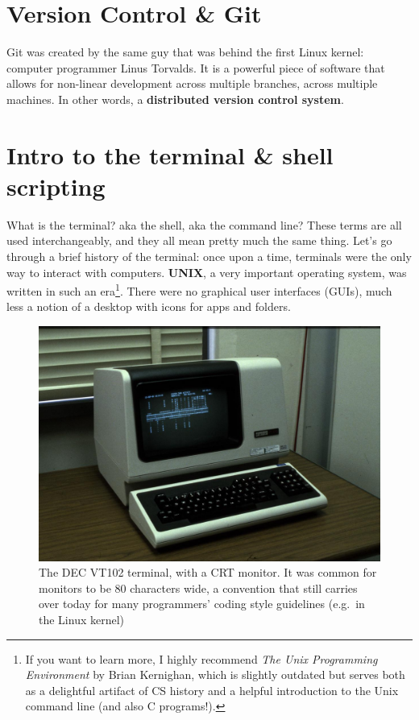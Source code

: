 \documentclass[fontsize=12pt,twoside=on,openright,parskip=half]{scrbook}
\begin{document}
\section*{Version Control \& Git}

Git was created by the same guy that was behind the first Linux kernel:
computer programmer Linus Torvalds. It is a powerful piece of software that
allows for non-linear development across multiple branches, across multiple
machines. In other words, a \textbf{distributed version control system}. 

\blindtext

\section*{Intro to the terminal \& shell scripting}

What is the terminal? aka the shell, aka the command line? These terms are all
used interchangeably, and they all mean pretty much the same thing. Let’s go
through a brief history of the terminal: once upon a time, terminals were the
only way to interact with computers. \textbf{UNIX}, a very important operating
system, was written in such an era\footnote{If you want to learn more, I highly
recommend \textit{The Unix Programming Environment} by Brian Kernighan, which
is slightly outdated but serves both as a delightful artifact of CS history and
a helpful introduction to the Unix command line (and also C programs!).}. There
were no graphical user interfaces (GUIs), much less a notion of a desktop with
icons for apps and folders.

\begin{figure}[h]
\centering
\includegraphics[scale=0.2]{dec}
\caption{\small{The DEC VT102 terminal, with a CRT monitor. It was common for monitors
to be 80 characters wide, a convention that still carries over today for many
programmers’ coding style guidelines (e.g.\ in the Linux kernel)}}
\end{figure}
\end{document}
